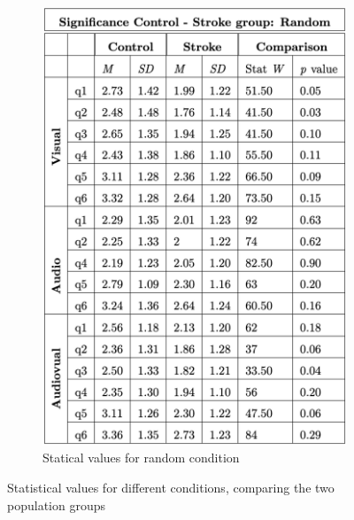 \begin{figure}[htbp]
\begin{subfigure}[htbp]{0.327\textwidth}
        \includegraphics[width=\textwidth]{significance_tables/significance_random_pop.png}
        \caption{Statical values for random condition}
        \label{fig: significance_pop_random} 
    \end{subfigure} 
    \caption{Statistical values for different conditions, comparing the two population groups}
    \label{fig: significance pop}
\end{figure}

